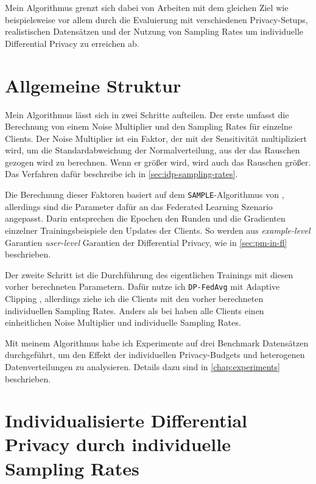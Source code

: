 Mein Algorithmus grenzt sich dabei von Arbeiten mit dem gleichen Ziel wie beispielsweise \textcite{aldaghri:2023} vor allem durch die Evaluierung mit verschiedenen Privacy-Setups, realistischen Datensätzen und der Nutzung von Sampling Rates um individuelle Differential Privacy zu erreichen ab.

\section{Allgemeine Struktur}
Mein Algorithmus lässt sich in zwei Schritte aufteilen. Der erste umfasst die Berechnung von einem Noise Multiplier und den Sampling Rates für einzelne Clients. Der Noise Multiplier ist ein Faktor, der mit der Sensitivität multipliziert wird, um die Standardabweichung der Normalverteilung, aus der das Rauschen gezogen wird zu berechnen. Wenn er größer wird, wird auch das Rauschen größer. Das Verfahren dafür beschreibe ich in \autoref{sec:idp-sampling-rates}. 

Die Berechnung dieser Faktoren basiert auf dem \texttt{SAMPLE}-Algorithmus von \textcite{boenisch:2023}, allerdings sind die Parameter dafür an das Federated Learning Szenario angepasst. Darin entsprechen die Epochen den Runden und die Gradienten einzelner Trainingsbeispiele den Updates der Clients. So werden aus \textit{example-level} Garantien \textit{user-level} Garantien der Differential Privacy, wie in \autoref{sec:pm-in-fl} beschrieben.

Der zweite Schritt ist die Durchführung des eigentlichen Trainings mit diesen vorher berechneten Parametern. Dafür nutze ich \texttt{DP-FedAvg} mit Adaptive Clipping \cite{andrew:2021}, allerdings ziehe ich die Clients mit den vorher berechneten individuellen Sampling Rates. Anders als bei \citeauthor{aldaghri:2023} haben alle Clients einen einheitlichen Noise Multiplier und individuelle Sampling Rates.

Mit meinem Algorithmus habe ich Experimente auf drei Benchmark Datensätzen durchgeführt, um den Effekt der individuellen Privacy-Budgets und heterogenen Datenverteilungen zu analysieren. Details dazu sind in \autoref{chap:experiments} beschrieben.

\section{Individualisierte Differential Privacy durch individuelle Sampling Rates}\label{sec:idp-sampling-rates}

